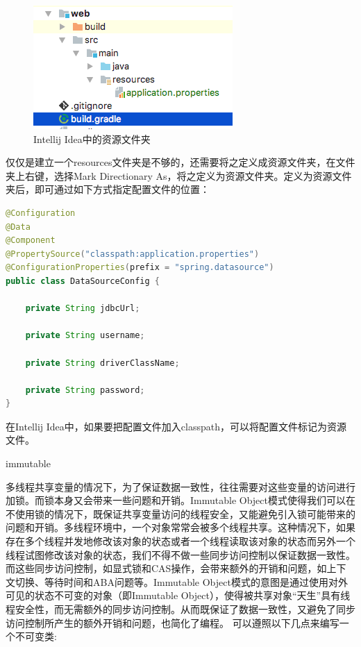 \documentclass[12pt]{book}
\makeatletter
\numberwithin{dummy}{section}
\theoremstyle{ocrenumbox}
\theoremstyle{blacknumex}
\theoremstyle{blacknumbox}
\theoremstyle{ocrenum}
\renewcommand{\subsection}{\@startsection {subsection}{2}{\z@}
	{-3ex \@plus -0.1ex \@minus -.4ex}
	{0.5ex \@plus.2ex }
	{\normalfont\sffamily\bfseries}}
\makeatother
\begin{document}
\begin{figure}[htbp]
	\centering
	\includegraphics[scale=0.8]{javaresourcefolder.png}
	\caption{Intellij Idea中的资源文件夹}
	\label{fig:javaresourcefolder}
\end{figure}

仅仅是建立一个resources文件夹是不够的，还需要将之定义成资源文件夹，在文件夹上右键，选择Mark Directionary As，将之定义为资源文件夹。定义为资源文件夹后，即可通过如下方式指定配置文件的位置：

\begin{lstlisting}[language=Java]
@Configuration
@Data
@Component
@PropertySource("classpath:application.properties")
@ConfigurationProperties(prefix = "spring.datasource")
public class DataSourceConfig {

	private String jdbcUrl;
	
	private String username;
	
	private String driverClassName;
	
	private String password;
}
\end{lstlisting}

在Intellij Idea中，如果要把配置文件加入classpath，可以将配置文件标记为资源文件。

\subsection{immutable}

多线程共享变量的情况下，为了保证数据一致性，往往需要对这些变量的访问进行加锁。而锁本身又会带来一些问题和开销。Immutable Object模式使得我们可以在不使用锁的情况下，既保证共享变量访问的线程安全，又能避免引入锁可能带来的问题和开销。多线程环境中，一个对象常常会被多个线程共享。这种情况下，如果存在多个线程并发地修改该对象的状态或者一个线程读取该对象的状态而另外一个线程试图修改该对象的状态，我们不得不做一些同步访问控制以保证数据一致性。而这些同步访问控制，如显式锁和CAS操作，会带来额外的开销和问题，如上下文切换、等待时间和ABA问题等。Immutable Object模式的意图是通过使用对外可见的状态不可变的对象（即Immutable Object），使得被共享对象“天生”具有线程安全性，而无需额外的同步访问控制。从而既保证了数据一致性，又避免了同步访问控制所产生的额外开销和问题，也简化了编程。
可以遵照以下几点来编写一个不可变类:
\end{document}
